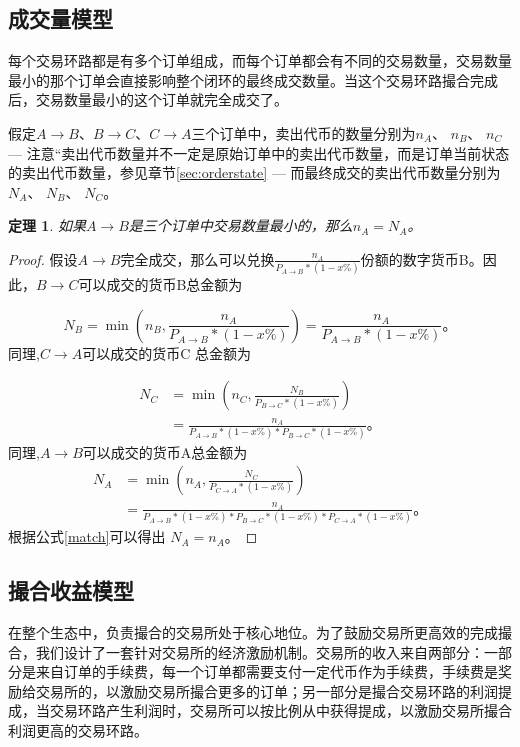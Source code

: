 \documentclass[UTF8,nofonts]{ctexart}
\newtheorem{theorem}{定理}[section]
\newtheorem{proof}{证明} [section]
\begin{document}
\subsection{成交量模型}
每个交易环路都是有多个订单组成，而每个订单都会有不同的交易数量，交易数量最小的那个订单会直接影响整个闭环的最终成交数量。当这个交易环路撮合完成后，交易数量最小的这个订单就完全成交了。

假定$A \rightarrow B$、$B \rightarrow C$、$C \rightarrow A$三个订单中，卖出代币的数量分别为$n_{A}$、 $n_{B}$、 $n_{C}$ --- 注意“卖出代币数量并不一定是原始订单中的卖出代币数量，而是订单当前状态的卖出代币数量，参见章节\ref{sec:orderstate} --- 而最终成交的卖出代币数量分别为$N_{A}$、 $N_{B}$、 $N_{C}$。

\begin{theorem}
如果$A \rightarrow B$是三个订单中交易数量最小的，那么$n_{A} = N_{A}$。
\end{theorem}

\begin{proof}
假设$A \rightarrow B$完全成交，那么可以兑换$\frac{n_{A}}{P_{A \rightarrow B}*(1-x\%)}$份额的数字货币B。因此，$B \rightarrow C$可以成交的货币B总金额为

$$N_{B}=\min(n_{B},\frac{n_{A}}{P_{A \rightarrow B}*(1-x\%)})=\frac{n_{A}}{P_{A \rightarrow B}*(1-x\%)}\text{。}$$
同理,$C \rightarrow A$可以成交的货币C 总金额为

\[ \begin{split}
N_{C}&=\min(n_{C},\frac{N_{B}}{P_{B \rightarrow C}*(1-x\%)})\\
&=\frac{n_{A}}{P_{A \rightarrow B}*(1-x\%)*P_{B \rightarrow C}*(1-x\%)}\text{。}
\end{split} \]
同理,$A \rightarrow B$可以成交的货币A总金额为
\[ \begin{split}
N_{A}&=\min(n_{A},\frac{N_{C}}{P_{C \rightarrow A}*(1-x\%)})\\
&=\frac{n_{A}}{P_{A \rightarrow B}*(1-x\%)*P_{B \rightarrow C}*(1-x\%)*P_{C \rightarrow A}*(1-x\%)}\text{。}
\end{split} \]
根据公式\ref{match}可以得出 $N_{A}=n_{A}$。
\end{proof}

\subsection{撮合收益模型}
在整个生态中，负责撮合的交易所处于核心地位。为了鼓励交易所更高效的完成撮合，我们设计了一套针对交易所的经济激励机制。交易所的收入来自两部分：一部分是来自订单的手续费，每一个订单都需要支付一定代币作为手续费，手续费是奖励给交易所的，以激励交易所撮合更多的订单；另一部分是撮合交易环路的利润提成，当交易环路产生利润时，交易所可以按比例从中获得提成，以激励交易所撮合利润更高的交易环路。
\end{document}
